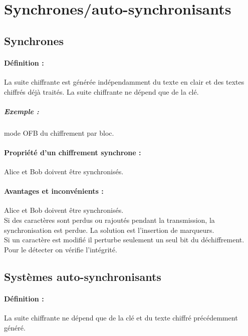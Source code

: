 \documentclass[12pt,a4paper]{report}
\begin{document}
\section{Synchrones/auto-synchronisants}
\subsection{Synchrones}
\paragraph{Définition : \\}
La suite chiffrante est générée indépendamment du texte en clair et des textes chiffrés déjà traités. La suite chiffrante ne dépend que de la clé.
\begin{center}
  \scalebox{0.6}{}	
\end{center}

\subparagraph{Exemple :} mode OFB du chiffrement par bloc.
\paragraph{Propriété d'un chiffrement synchrone :\\}
Alice et Bob doivent être synchronisés.
\begin{center}
  \scalebox{0.6}{}	
\end{center}

\paragraph{Avantages et inconvénients :\\}
Alice et Bob doivent être synchronisés.\\
Si des caractères sont perdus ou rajoutés pendant la transmission, la synchronisation est perdue. La solution est l'insertion de marqueurs.\\
Si un caractère est modifié il perturbe seulement un seul bit du déchiffrement. Pour le détecter on vérifie l'intégrité.
\subsection{Systèmes auto-synchronisants}
\paragraph{Définition :\\}
La suite chiffrante ne dépend que de la clé et du texte chiffré précédemment généré.
\begin{center}
  \scalebox{0.7}{}	
\end{center}
\end{document}
